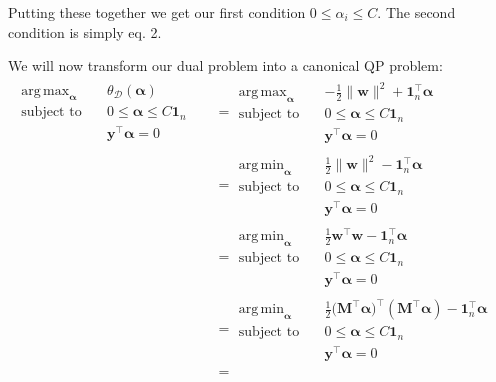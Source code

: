 \documentclass{article}
\renewcommand{\vec}[1]{\mathbf{#1}}
\newcommand{\mat}[1]{\mathbf{#1}}
\DeclareMathOperator*{\argmax}{arg\,max}
\DeclareMathOperator*{\argmin}{arg\,min}
\begin{document}
Putting these together we get our first condition $0\le\alpha_i\le C$. The second condition is simply eq. 2.
\bigskip

We will now transform our dual problem into a canonical QP problem:
\begin{align*}
    \begin{array}{rcll}
        \displaystyle\argmax_{\bm\alpha} &~ &\theta_{\mathcal D}(\bm\alpha)&\\
        \text{subject to}&~ &0\le\bm\alpha\le C\vec 1_n\\
        &~ &\vec y^\top\bm\alpha=0
    \end{array}&=\begin{array}{rcll}
        \displaystyle\argmax_{\bm\alpha} &~ &\displaystyle-\frac{1}{2}\|\vec w\|^2+\vec1_n^\top\bm\alpha&\\
        \text{subject to}&~ &0\le\bm\alpha\le C\vec 1_n\\
        &~ &\vec y^\top\bm\alpha=0
    \end{array}\tag{def. of $\theta_D$}\\
    &=\begin{array}{rcll}
        \displaystyle\argmin_{\bm\alpha} &~ &\displaystyle\frac{1}{2}\|\vec w\|^2-\vec1_n^\top\bm\alpha&\\
        \text{subject to}&~ &0\le\bm\alpha\le C\vec 1_n\\
        &~ &\vec y^\top\bm\alpha=0
    \end{array}\tag{negation of max $=$ min}\\
    &=\begin{array}{rcll}
        \displaystyle\argmin_{\bm\alpha} &~ &\displaystyle\frac{1}{2}\vec w^\top\vec w-\vec1_n^\top\bm\alpha&\\
        \text{subject to}&~ &0\le\bm\alpha\le C\vec 1_n\\
        &~ &\vec y^\top\bm\alpha=0
    \end{array}\tag{def. of $L_2$ norm}\\
    &=\begin{array}{rcll}
        \displaystyle\argmin_{\bm\alpha} &~ &\displaystyle\frac{1}{2}\vec (\mat M^\top\bm\alpha)^\top(\mat M^\top\bm\alpha)-\vec1_n^\top\bm\alpha&\\
        \text{subject to}&~ &0\le\bm\alpha\le C\vec 1_n\\
        &~ &\vec y^\top\bm\alpha=0
    \end{array}\tag{eq. 1}\\
    &=\begin{array}{rcll}

\end{array}
\end{align*}
\end{document}
